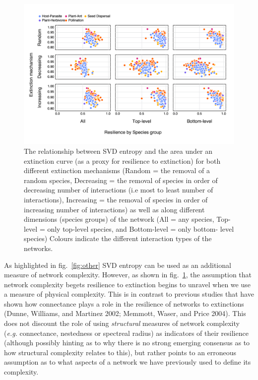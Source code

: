 \documentclass[11pt]{article}
\makeatletter
\def\maxwidth{\ifdim\Gin@nat@width>\linewidth\linewidth
\else\Gin@nat@width\fi}
\let\Oldincludegraphics\includegraphics
\renewcommand{\includegraphics}[1]{\Oldincludegraphics[width=\maxwidth]{#1}}
\makeatother
\begin{document}
\begin{figure}
\hypertarget{fig:resilience}{%
\centering
\includegraphics{figures/entropy_v_AUCall.png}
\caption{The relationship between SVD entropy and the area under an
extinction curve (as a proxy for resilience to extinction) for both
different extinction mechanisms (Random = the removal of a random
species, Decreasing = the removal of species in order of decreasing
number of interactions (i.e most to least number of interactions),
Increasing = the removal of species in order of increasing number of
interactions) as well as along different dimensions (species groups) of
the network (All = any species, Top-level = only top-level species, and
Bottom-level = only bottom- level species) Colours indicate the
different interaction types of the networks.}\label{fig:resilience}
}
\end{figure}

As highlighted in fig.~\ref{fig:other} SVD entropy can be used as an
additional measure of network complexity. However, as shown in
fig.~\ref{fig:resilience}, the assumption that network complexity begets
resilience to extinction begins to unravel when we use a measure of
physical complexity. This is in contrast to previous studies that have
shown how connectance plays a role in the resilience of networks to
extinctions (Dunne, Williams, and Martinez 2002; Memmott, Waser, and
Price 2004). This does not discount the role of using \emph{structural}
measures of network complexity (\emph{e.g.} connectance, nestedness or
spectreal radius) as indicators of their resilience (although possibly
hinting as to why there is no strong emerging consensus as to how
structural complexity relates to this), but rather points to an
erroneous assumption as to what aspects of a network we have previously
used to define its complexity.
\end{document}
